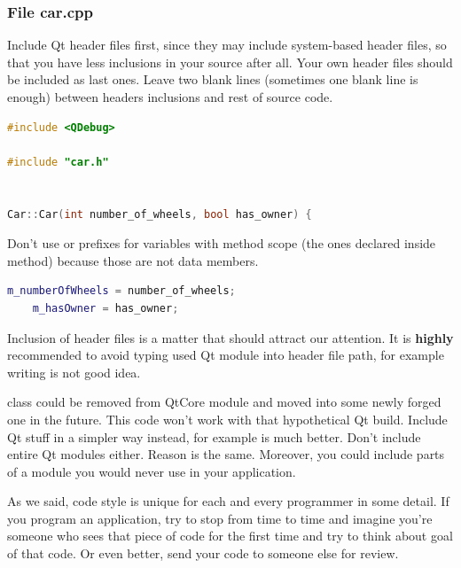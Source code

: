 \subsubsection*{File car.cpp}
Include Qt header files first, since they may include system-based header files, so that you have less inclusions in your source after all. Your own header files should be included as last ones. Leave two blank lines (sometimes one blank line is enough) between headers inclusions and rest of source code.
\begin{lstlisting}[firstnumber=1,language=cpp]
#include <QDebug>

#include "car.h"


Car::Car(int number_of_wheels, bool has_owner) {
\end{lstlisting}
Don't use or prefixes for variables with method scope (the ones declared inside method) because those are not data members.
\begin{lstlisting}[firstnumber=6,language=cpp]
    m_numberOfWheels = number_of_wheels;
    m_hasOwner = has_owner;
\end{lstlisting}

\begin{fdocextra}
Inclusion of header files is a matter that should attract our attention. It is \textbf{highly} recommended to avoid typing used Qt module into header file path, for example writing is not good idea.

 class could be removed from QtCore module and moved into some newly forged one in the future.\footnotemark{} This code won't work with that hypothetical Qt build. Include Qt stuff in a simpler way instead, for example is much better. Don't include entire Qt modules either. Reason is the same. Moreover, you could include parts of a module you would never use in your application.
\end{fdocextra}

As we said, code style is unique for each and every programmer in some detail. If you program an application, try to stop from time to time and imagine you're someone who sees that piece of code for the first time and try to think about goal of that code. Or even better, send your code to someone else for review.